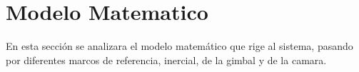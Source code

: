 \chapter{Modelo Matematico}
En esta sección se analizara el modelo matemático que rige al sistema, pasando
por diferentes marcos de referencia, inercial, de la gimbal y de la camara.